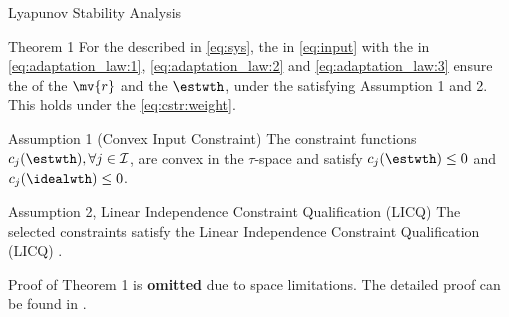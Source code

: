 \documentclass[8pt, aspectratio=169]{beamer}
\newcommand{\ctxt}[2]{\color{#1}{#2}\color{black}}
\begin{document}
\begin{frame}{\insertsubsectionhead}{Lyapunov Stability Analysis}

  \centering
  \begin{minipage}{.9\textwidth}

    \begin{block}{Theorem 1 \cite{Ryu:2025aa}}
      For the \ctxt{airforceblue}{dynamical system } described in \eqref{eq:sys}, the \ctxt{awesome}{neuro-adaptive controller } in \eqref{eq:input} with the \ctxt{airforceblue}{weight adaptation laws } in \eqref{eq:adaptation_law:1}, \eqref{eq:adaptation_law:2} and \eqref{eq:adaptation_law:3} ensure the \ctxt{airforceblue}{boundedness } of the \ctxt{awesome}{filtered error } $\mv{r}$ and the \ctxt{awesome}{weight estimate } $\estwth$, under the \ctxt{airforceblue}{control input constraints} satisfying Assumption 1 and 2. This holds under the \ctxt{awesome}{weight norm constraint } \eqref{eq:cstr:weight}.
    \end{block}

    \begin{exampleblock}{Assumption 1 (Convex Input Constraint)}
      The constraint functions $c_j(\estwth),\forall j\in\mathcal{I}$, are convex in the $\tau$-space and satisfy $c_j(\estwth)\le0$ and $c_j(\idealwth)\le0$.
    \end{exampleblock}

    \begin{exampleblock}{Assumption 2, Linear Independence Constraint Qualification (LICQ)}
      The selected constraints satisfy the Linear Independence Constraint Qualification (LICQ) \cite[Chap. 12 Def. 12.1]{Nocedal:2006aa}.
    \end{exampleblock}

  \end{minipage}

  \vspace{.2cm}

  Proof of Theorem 1 is \textbf{omitted } due to space limitations. The detailed proof can be found in \cite{Ryu:2025aa}.

\end{frame}

\end{document}
